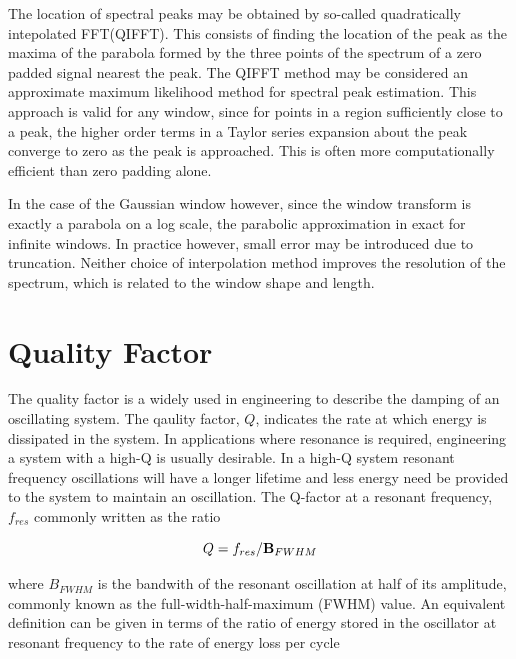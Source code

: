 
The location of spectral peaks may be obtained by so-called quadratically
intepolated FFT(QIFFT). This consists of finding the location of the peak as the
maxima of the parabola formed by the three points of the spectrum of a zero
padded signal nearest the peak. The QIFFT method may be considered an approximate maximum likelihood method for spectral peak estimation. This approach is valid for any window, since for points in a region sufficiently close to a peak, the higher order terms in a Taylor series expansion about the peak converge to zero as the peak is approached. This is often more computationally efficient than zero padding alone.

In the case of the Gaussian window however, since the window transform is
exactly a parabola on a log scale, the parabolic approximation in exact for
infinite windows. In practice however, small error may be introduced due to truncation.
Neither choice of interpolation method improves the resolution of the spectrum, which is related to the window shape and length.
\section{Quality Factor}
The quality factor is a widely used in engineering to describe the damping of an
oscillating system. The qaulity factor, $Q$, indicates the rate at which energy
is dissipated in the system. In applications where resonance is required,
engineering a system with a high-Q is usually desirable. In a high-Q system
resonant frequency oscillations will have a longer lifetime and less energy need
be provided to the system to maintain an oscillation. The Q-factor at a resonant
frequency, $f_{res}$ commonly written as the ratio

$$
Q = f_{res}/\mathbf{B}_{FWHM}
$$

where $B_{FWHM}$ is the bandwith of the resonant oscillation at half of its
amplitude, commonly known as the full-width-half-maximum (FWHM) value. An
equivalent definition can be given in terms of the ratio of energy stored in the
oscillator at resonant frequency to the rate of energy loss per cycle

